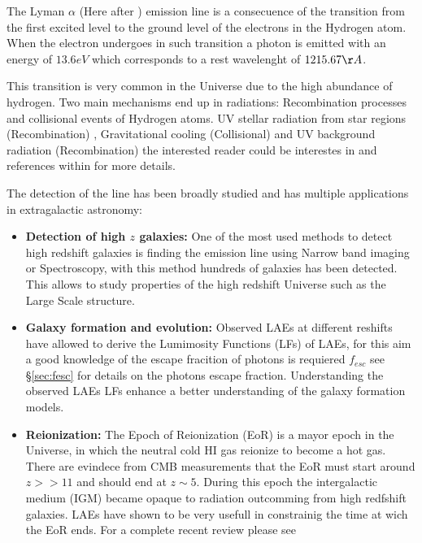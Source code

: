 The Lyman $\alpha$ (Here after \ly) emission line is a consecuence of the 
transition 
from the first excited level to the ground level of the electrons
in the Hydrogen atom. When the electron undergoes in such transition 
a photon is emitted with an energy of $13.6eV$ which corresponds to 
a rest wavelenght of $1215.67 \AA$. 

This transition is very common in the Universe due to the high abundance
of hydrogen. Two main mechanisms end up in \ly radiations: Recombination 
processes and collisional events of Hydrogen atoms. UV stellar radiation
from star regions (Recombination) , Gravitational 
cooling (Collisional) and UV background radiation (Recombination) the interested
reader could be interestes in\citep{LaursenPhD} and references within for
more details. 

The detection of the \ly line has been broadly studied and has multiple 
applications in extragalactic astronomy:

\begin{itemize}
\item {\bf{Detection of high $z$ galaxies:}} One of the most used 
methods to detect high redshift galaxies is finding the \ly emission 
line using Narrow band imaging or Spectroscopy, with this method 
hundreds of galaxies has been detected. This 
allows to study properties of the high redshift Universe such as
the Large Scale structure. 
 
\item {\bf{Galaxy formation and evolution:}} Observed LAEs at different
reshifts have allowed to derive the Lumimosity Functions (LFs) of LAEs, 
for this aim a good knowledge of the escape fracition of 
photons is requiered $f_{esc}$ see \S \ref{sec:fesc} for details on the \ly
photons escape fraction. Understanding the observed LAEs LFs enhance a
better understanding of the galaxy formation models. 

\item {\bf{Reionization:}} The Epoch of Reionization (EoR) is a mayor
epoch in the Universe, in which the neutral cold HI gas reionize to 
become a hot gas. There are evindece from CMB measurements that 
the EoR must start around $z >> 11$ and should end at $z\sim5$. During this 
epoch the intergalactic medium (IGM) became opaque to \ly radiation 
outcomming from high redfshift galaxies. LAEs have shown to be 
very usefull in constrainig the time at wich the EoR ends. For a complete
recent review please see \citep{review}
 
\end{itemize}


